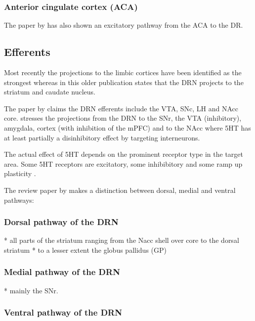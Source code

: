 \documentclass[12pt,a4paper]{article}
\begin{document}
\subsubsection{Anterior cingulate cortex (ACA)}

The paper by  \citep{PollakDorocic2014} has also shown an excitatory pathway from the ACA to the DR.

\subsection{Efferents}

Most recently the projections to the limbic cortices have been identified as the strongest \citep{Linley2013} \citep{Roberts2011} whereas in this older publication \citep{Reisine1984} states that the DRN projects to the striatum and caudate nucleus. 

The paper by \citep{Vertes2010} claims the DRN efferents include the VTA, SNc, LH and NAcc core. \citep{Nakamura2013} stresses the projections from the DRN to the SNr, the VTA (inhibitory), amygdala, cortex (with inhibition of the mPFC) and to the NAcc where 5HT has at least partially a disinhibitory effect by targeting interneurons.

The actual effect of 5HT depends on the prominent receptor type in the target area. Some 5HT receptors are excitatory, some inhibibitory and some ramp up plasticity \citep{Frazer1999}.

The review paper by \citep{Michelsen2007} makes a distinction between dorsal, medial and ventral pathways:

\subsubsection{Dorsal pathway of the DRN}

  * all parts of the striatum ranging from the Nacc shell over core to the dorsal striatum
  * to a lesser extent the globus pallidus (GP)

\subsubsection{Medial pathway of the DRN}

  * mainly the SNr.

\subsubsection{Ventral pathway of the DRN}
\end{document}
